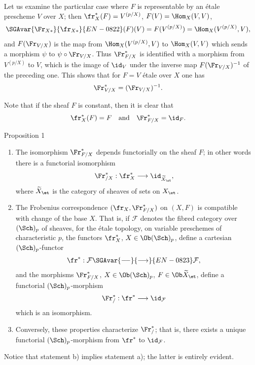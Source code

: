 Let us examine the particular case where $F$ is representable by an étale prescheme $V$ over $X$; then $\fr_X^*(F)=V^{(p/X)}$, $F(V)=\Hom_X(V,V)$,
\[
\SGAvar{\Fr_{X*}}{\fr_{X*}}{EN-0822}(F)(V)=F(V^{(p/X)})=\Hom_X(V^{(p/X)},V),
\]
and $F(\Fr_{V/X})$ is the map from $\Hom_X(V^{(p/X)},V)$ to $\Hom_X(V,V)$ which sends a morphism $\psi$ to $\psi\circ\Fr_{V/X}$. Thus $\Fr^*_{F/X}$ is identified with a morphism from $V^{(p/X)}$ to $V$, which is the image of $\id_V$ under the inverse map $F(\Fr_{V/X})^{-1}$ of the preceding one. This shows that for $F=V$ étale over $X$ one has
\[
\Fr^*_{V/X}=(\Fr_{V/X})^{-1}.
\]

Note that if the sheaf $F$ is constant, then it is clear that
\[
\fr_X^*(F)=F
\quad\text{and}\quad
\Fr^*_{F/X}=\id_F.
\]

\begin{statement}{Proposition 1}
\begin{enumerate}[label=\alph*)]
\item The isomorphism $\Fr^*_{F/X}$ depends functorially on the sheaf $F$; in other words there is a functorial isomorphism
\[
\Fr^*_{/X}:\fr_X^*\longrightarrow \id_{\widetilde X_{\et}},
\]
where $\widetilde X_{\et}$ is the category of sheaves of sets on $X_{\et}$.
\item The Frobenius correspondence $(\fr_X,\Fr^*_{F/X})$ on $(X,F)$ is compatible with change of the base $X$. That is, if $\mathcal F$ denotes the fibred category over $(\Sch)_p$ of sheaves, for the étale topology, on variable preschemes of characteristic $p$, the functors $\fr_X^*$, $X\in\Ob(\Sch)_p$, define a cartesian $(\Sch)_p$-functor
\[
\fr^*: \mathcal F\SGAvar{\relbar\joinrel\relbar}{\longrightarrow}{EN-0823}\mathcal F,
\]
and the morphisms $\Fr^*_{F/X}$, $X\in\Ob(\Sch)_p$, $F\in\Ob\widetilde X_{\et}$, define a functorial $(\Sch)_p$-morphism
\[
\Fr^*_{/}:\fr^*\longrightarrow\id_{\mathcal F}
\]
which is an isomorphism.
\item Conversely, these properties characterize $\Fr^*_{/}$; that is, there exists a unique functorial $(\Sch)_p$-morphism from $\fr^*$ to $\id_{\mathcal F}$.
\end{enumerate}
\end{statement}

Notice that statement b) implies statement a); the latter is entirely evident.

